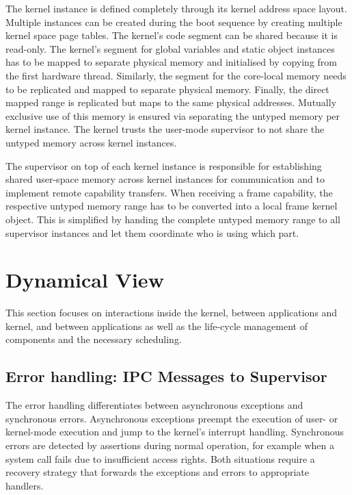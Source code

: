 The kernel instance is defined completely through its kernel address space layout. Multiple instances can be created during the boot sequence  by creating multiple kernel space page tables. The kernel's code segment can be shared because it is read-only. The kernel's segment for global variables and static object instances has to be mapped to separate physical memory and initialised by copying from the first hardware thread. Similarly, the segment for the core-local memory needs to be replicated and mapped to separate physical memory. Finally, the direct mapped range is replicated but maps to the same physical addresses. Mutually exclusive use of this memory is ensured via separating the untyped memory per kernel instance. The kernel trusts the user-mode supervisor to not share the untyped memory across kernel instances.

The supervisor on top of each kernel instance is responsible for establishing shared user-space memory across kernel instances for communication and to implement remote capability transfers. When receiving a frame capability, the respective untyped memory range has to be converted into a local frame kernel object. This is simplified by handing the complete untyped memory range to all supervisor instances and let them coordinate who is using which part. 


\section{Dynamical View}
\label{sec:global-dynamical-view}

This section focuses on interactions inside the kernel, between applications and kernel, and between applications as well as the life-cycle management of components and the necessary scheduling.

\subsection{Error handling: IPC Messages to Supervisor}
\label{sec:error-dyn}

The error handling differentiates between asynchronous exceptions and synchronous errors. Asynchronous exceptions preempt the execution of user- or kernel-mode execution and jump to the kernel's interrupt handling. Synchronous errors are detected by assertions during normal operation, for example when a system call fails due to insufficient access rights.
Both situations require a recovery strategy that forwards the exceptions and errors to appropriate handlers.

